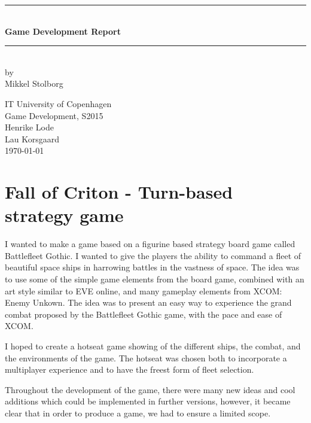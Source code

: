 \documentclass[a4paper,11pt]{article}
\begin{document}
\begin{titlepage}

\centering \parindent=0pt
\newcommand{\HRule}{\rule{\textwidth}{1mm}}
 \HRule\\[1cm]\Huge\bfseries
Game Development Report\\[0.7cm]
\HRule\\[4cm]  
\large by 
\\ Mikkel Stolborg
 \normalsize %
\begin{flushleft}
IT University of Copenhagen \\
Game Development, S2015\\
Henrike Lode\\
Lau Korsgaard\\
\today \end{flushleft}
\end{titlepage}

\tableofcontents
\pagebreak
\section{Fall of Criton - Turn-based strategy game}
I wanted to make a game based on a figurine based strategy board game called Battlefleet Gothic\cite{batgotwiki}. I wanted to give the players the ability to command a fleet of beautiful space ships in harrowing battles in the vastness of space. The idea was to use some of the simple game elements from the board game, combined with an art style similar to EVE online\cite{eveonline}, and many gameplay elements from XCOM: Enemy Unkown\cite{xcom}. 
The idea was to present an easy way to experience the grand combat proposed by the Battlefleet Gothic game, with the pace and ease of XCOM.

I hoped to create a hotseat game showing of the different ships, the combat, and the environments of the game. The hotseat was chosen both to incorporate a multiplayer experience and to have the freest form of fleet selection. 

Throughout the development of the game, there were many new ideas and cool additions which could be implemented in further versions, however, it became clear that in order to produce a game, we had to ensure a limited scope. 
\end{document}
